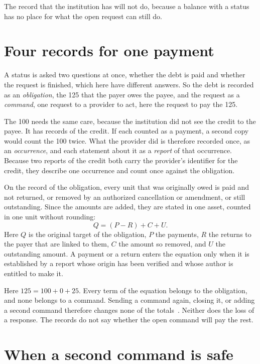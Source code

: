 \documentclass{momentum}
\begin{document}
The record that the institution has will not do, because a balance with a status has no place for what the open request can still do.

\section{Four records for one payment}
\label{sec:records}

A status is asked two questions at once, whether the debt is paid and whether the request is finished, which here have different answers. So the debt is recorded as an \emph{obligation}, the 125 that the payer owes the payee, and the request as a \emph{command}, one request to a provider to act, here the request to pay the 125.

The 100 needs the same care, because the institution did not see the credit to the payee. It has records of the credit. If each counted as a payment, a second copy would count the 100 twice. What the provider did is therefore recorded once, as an \emph{occurrence}, and each statement about it as a \emph{report} of that occurrence. Because two reports of the credit both carry the provider's identifier for the credit, they describe one occurrence and count once against the obligation.

On the record of the obligation, every unit that was originally owed is paid and not returned, or removed by an authorized cancellation or amendment, or still outstanding. Since the amounts are added, they are stated in one asset, counted in one unit without rounding:
\[
 Q=(P-R)+C+U.
\]
Here $Q$ is the original target of the obligation, $P$ the payments, $R$ the returns to the payer that are linked to them, $C$ the amount so removed, and $U$ the outstanding amount. A payment or a return enters the equation only when it is established by a report whose origin has been verified and whose author is entitled to make it.

Here $125=100+0+25$. Every term of the equation belongs to the obligation, and none belongs to a command. Sending a command again, closing it, or adding a second command therefore changes none of the totals~\cite[Section~5.9]{op}. Neither does the loss of a response. The records do not say whether the open command will pay the rest.

\section{When a second command is safe}
\label{sec:reservations}
\end{document}
